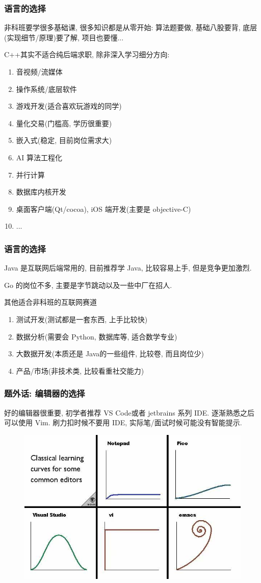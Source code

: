 \documentclass{ctexbeamer}
\begin{document}
\begin{frame}
	\frametitle{语言的选择}

	非科班要学很多基础课, 很多知识都是从零开始: 算法题要做, 基础八股要背, 底层(实现细节/原理)要了解, 项目也要懂...

	C++其实不适合纯后端求职, 除非深入学习细分方向:
	\begin{enumerate}
		\item 音视频/流媒体
		\item 操作系统/底层软件
		\item 游戏开发(适合喜欢玩游戏的同学)
		\item 量化交易(门槛高, 学历很重要)
		\item 嵌入式(稳定, 目前岗位需求大)
		\item AI 算法工程化
		\item 并行计算
		\item 数据库内核开发
		\item 桌面客户端(Qt/cocoa), iOS 端开发(主要是 objective-C)
		\item ...
	\end{enumerate}
\end{frame}
\begin{frame}
	\frametitle{语言的选择}
	Java 是互联网后端常用的, 目前推荐学 Java, 比较容易上手, 但是竞争更加激烈.

	Go 的岗位不多, 主要是字节跳动以及一些中厂在招人.

	\begin{exampleblock}{其他适合非科班的互联网赛道}
		\begin{enumerate}
			\item 测试开发(测试都是一套东西, 上手比较快)
			\item 数据分析(需要会 Python, 数据库等, 适合数学专业)
			\item 大数据开发(本质还是 Java的一些组件, 比较卷, 而且岗位少)
			\item 产品/市场(非技术类, 比较看重社交能力)
		\end{enumerate}
	\end{exampleblock}
\end{frame}

\begin{frame}
	\frametitle{题外话:  编辑器的选择}
	好的编辑器很重要, 初学者推荐 VS Code或者 jetbrains 系列 IDE. 
	逐渐熟悉之后可以使用 Vim. 
	刷力扣时候不要用 IDE, 实际笔/面试时候可能没有智能提示. 
	\begin{figure}\centering
		\includegraphics[width=.7\textwidth]{figures/editor.jpg}
	\end{figure}
\end{frame}
\end{document}
